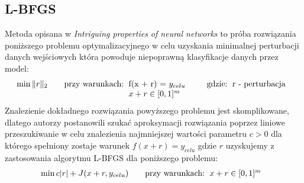 \documentclass[
    left=2.5cm,         %
    right=2.5cm,        %
    top=2.5cm,          %
    bottom=3cm,         %
    bindingoffset=6mm,  %
    nohyphenation=false %
]{eiti/eiti-thesis}
\begin{document}
\subsection{L-BFGS}
Metoda opisana w \textit{Intriguing properties of neural networks}\cite{DBLP:journals/corr/SzegedyZSBEGF13}
to próba rozwiązania poniższego problemu optymalizacyjnego w celu uzyskania minimalnej perturbacji danych wejściowych
która powoduje niepoprawną klasyfikacje danych przez model:
    \begin{equation}
    \min{\| r\|_{2}}
    \qquad\text{przy warunkach:}
    \begin{tabular}[t]{ll}
    f(x + r) = $y_{celu}$ \\
    $x+r \in [0,1]^{m}$ \\
    \end{tabular}
    \qquad\text{gdzie:}
    \begin{tabular}[t]{ll}
    r - perturbacja \\
    \end{tabular}
    \end{equation}
Znalezienie dokładnego rozwiązania powyższego problemu jest skomplikowane, dlatego autorzy postanowili szukać aproksymacji
rozwiązania poprzez liniowe przeszukiwanie w celu znalezienia najmniejszej wartości parametru $c > 0$ dla którego spełniony
zostaje warunek $f(x+r) = y_{celu}$ gdzie $r$ uzyskujemy z zastosowania algorytmu L-BFGS dla poniższego problemu:
    \begin{equation}
    \min{c| r| + J(x+r, y_{celu})}
    \qquad\text{przy warunkach:}
    \begin{tabular}[t]{ll}
    $x+r \in [0,1]^{m}$ \\
    \end{tabular}
    \end{equation}
\end{document}
